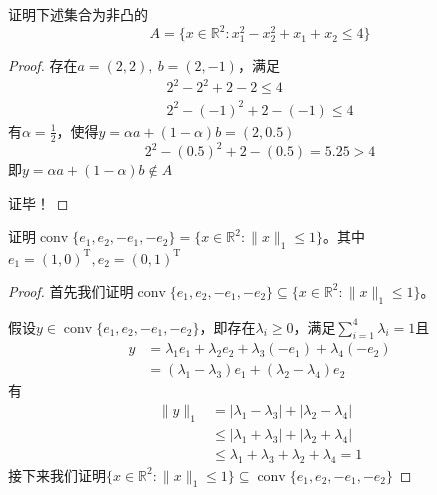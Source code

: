 \begin{problemset}
    \item 证明下述集合为非凸的
    \[
        A = \{x\in \mathbb{R}^2:x_1^2-x_2^2+x_1+x_2\leq 4\}
    \]
    \begin{proof}
        存在$a = (2,2),\ b = (2,-1)$，满足
        \[
            \begin{array}{c}
                2^2-2^2+2-2 \leq 4\\
                2^2-(-1)^2+2-(-1) \leq 4
            \end{array}
        \]
        有$\alpha = \frac{1}{2}$，使得$y = \alpha a + (1-\alpha)b = (2,0.5)$
        \[
            2^2-(0.5)^2+2-(0.5) = 5.25 > 4
        \]
        即$y = \alpha a + (1-\alpha)b\notin A$

        证毕！
    \end{proof}
    \item 证明$\operatorname{conv}\{e_1,e_2,-e_1,-e_2\} = \{x\in \mathbb{R}^2: \|x\|_1\leq 1\}$。其中$e_1 = (1,0)^{\mathrm{T}},e_2 = (0,1)^{\mathrm{T}}$
    \begin{proof}
        首先我们证明$\operatorname{conv}\{e_1,e_2,-e_1,-e_2\}\subseteq \{x\in \mathbb{R}^2: \|x\|_1\leq 1\}$。

        假设$y\in \operatorname{conv}\{e_1,e_2,-e_1,-e_2\}$，即存在$\lambda_i\geq 0$，满足$\sum_{i = 1}^{4} \lambda_i = 1$且
        \[
            \begin{array}{ll}
                y &=\lambda_1e_1+\lambda_2e_2+\lambda_3(-e_1)+\lambda_4(-e_2)\\
                &=(\lambda_1-\lambda_3)e_1+(\lambda_2-\lambda_4)e_2
            \end{array}
        \]
        有
        \[
            \begin{array}{ll}
                \|y\|_1 &= |\lambda_1-\lambda_3| + |\lambda_2-\lambda_4|\\
                &\leq |\lambda_1+\lambda_3| + |\lambda_2+\lambda_4|\\
                &\leq \lambda_1+\lambda_3 + \lambda_2+\lambda_4 = 1
            \end{array}  
        \]
        接下来我们证明$\{x\in \mathbb{R}^2: \|x\|_1\leq 1\}\subseteq \operatorname{conv}\{e_1,e_2,-e_1,-e_2\}$


\end{proof}
\end{problemset}
